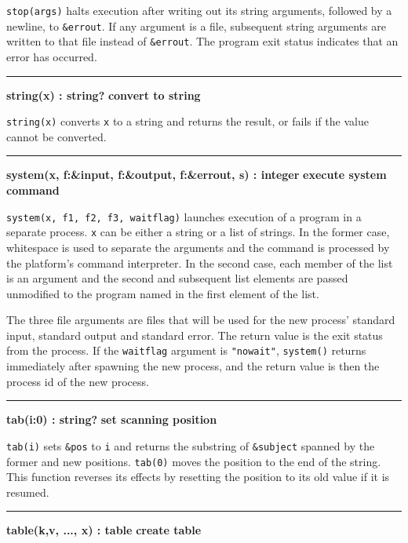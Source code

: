 \noindent
{}\texttt{stop(args)} halts execution after
writing out its string arguments, followed by a newline, to
\texttt{\&errout}. If any argument is a file, subsequent string
arguments are written to that file instead of \texttt{\&errout}. The
program exit status indicates that an error has occurred.

\bigskip\hrule\vspace{0.1cm}
\noindent
{\bf string(x) : string? } \hfill {\bf convert to string}

\noindent
{}\texttt{string(x)} converts
\texttt{x} to a string and returns the result, or fails if the value
cannot be converted.

\bigskip\hrule\vspace{0.1cm}
\noindent
{\bf system(x, f:\&input, f:\&output, f:\&errout, s) : integer } \hfill {\bf execute system command}

\noindent
{}\texttt{system(x, f1, f2, f3, waitflag)} launches
execution of a program in a separate process. \texttt{x} can be either
a string or a list of strings. In the former case, whitespace is used
to separate the arguments and the command is processed by the
platform's command interpreter. In the second case,
each member of the list is an argument and the second and subsequent
list elements are passed unmodified to the program named in the first
element of the list.

The three file arguments are files that will be used for the new
process' standard input, standard output and standard
error. The return value is the exit status from the process. If the
\texttt{waitflag} argument is
\texttt{"nowait"}, \texttt{system()}
returns immediately after spawning the new process, and the return
value is then the process id of the new process.

\bigskip\hrule\vspace{0.1cm}
\noindent
{\bf tab(i:0) : string? } \hfill {\bf set scanning position}

\noindent
{}\texttt{tab(i)} sets \texttt{\&pos} to \texttt{i} and
returns the substring of \texttt{\&subject} spanned by the former and
new positions. \texttt{tab(0)} moves the position to the end of the
string. This function reverses its effects by resetting the position to
its old value if it is resumed.

\bigskip\hrule\vspace{0.1cm}
\noindent
{\bf table(k,v, ..., x) : table } \hfill {\bf create table}

